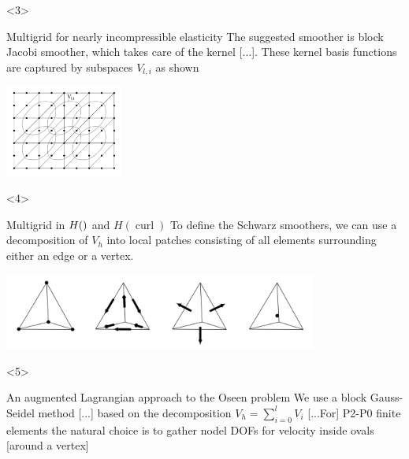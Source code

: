 \documentclass[presentation,aspectratio=43,10pt]{beamer}
\let\div\relax
\DeclareMathOperator{\div}{div}
\DeclareMathOperator{\curl}{curl}
\begin{document}
\begin{frame}
  \begin{onlyenv}<3>
    \begin{block}{Multigrid for nearly incompressible elasticity}
      The suggested smoother is block Jacobi smoother, which takes
      care of the kernel [...]. These kernel basis functions are
      captured by subspaces $V_{l,i}$ as shown
      \begin{center}
        \includegraphics[height=3cm]{schoeberl}
      \end{center}
      \begin{flushright}
        \textcite{Schoeberl:1999} \hspace{4em}
      \end{flushright}
    \end{block}
  \end{onlyenv}

  \begin{onlyenv}<4>
    \begin{block}{Multigrid in $H(\div)$ and $H(\curl)$}
      To define the Schwarz smoothers, we can use a decomposition of
      $V_h$ into local patches consisting of all elements surrounding
      either an edge or a vertex.

      \begin{center}
        \includegraphics[height=2.5cm]{arnold}
      \end{center}
      \begin{flushright}
        \textcite{Arnold:2000} \hspace{4em}
      \end{flushright}
    \end{block}
  \end{onlyenv}

  \begin{onlyenv}<5>
    \begin{block}{An augmented Lagrangian approach to the Oseen problem}
      We use a block Gauss-Seidel method [...] based on the
      decomposition $V_h = \sum_{i=0}^l V_i$ [...For] P2-P0 finite
      elements the natural choice is to gather nodel DOFs for velocity
      inside ovals [around a vertex]


\end{block}
\end{onlyenv}
\end{frame}
\end{document}
